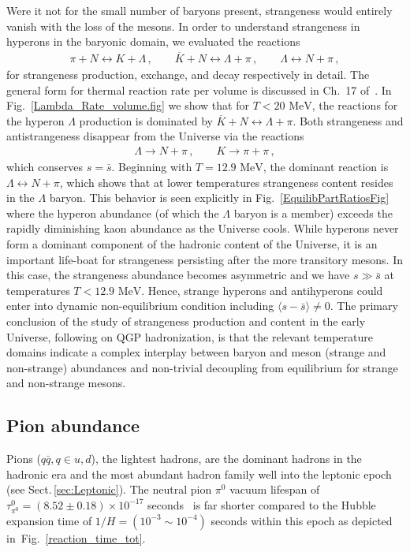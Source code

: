\documentclass[universe,article,submit,moreauthors,pdftex,a4paper]{Definitions/mdpi}
\newcommand{\MeV}{\text{ MeV}}
\newcommand*{\rf}[1]{Fig.~{\ref{#1}}}
\newcommand*{\rsec}[1]{Sect.\,{\ref{#1}}}
\begin{document}
Were it not for the small number of baryons present, strangeness would entirely vanish with the loss of the mesons. In order to understand strangeness in hyperons in the baryonic domain, we evaluated the reactions 
\begin{align}
 \pi +N\leftrightarrow K+\Lambda\,,\qquad \overline{K}+N\leftrightarrow \Lambda+\pi\,,\qquad \Lambda\leftrightarrow N+\pi\,,
\end{align}
for strangeness production, exchange, and decay respectively in detail. The general form for thermal reaction rate per volume is discussed in Ch.~17 of~\cite{Letessier:2002ony}. In \rf{Lambda_Rate_volume.fig} we show that for $T<20\MeV$, the reactions for the hyperon $\Lambda$ production is dominated by $\overline{K}+N\leftrightarrow\Lambda+\pi$. Both strangeness and antistrangeness disappear from the Universe via the reactions
\begin{align}
    \Lambda\rightarrow N+\pi\,,\qquad K\to\pi+\pi\,,
\end{align}
which conserves $s=\bar s$. Beginning with $T=12.9\MeV$, the dominant reaction is $\Lambda\leftrightarrow N+\pi$, which shows that at lower temperatures strangeness content resides in the $\Lambda$ baryon. This behavior is seen explicitly in \rf{EquilibPartRatiosFig} where the hyperon abundance (of which the $\Lambda$ baryon is a member) exceeds the rapidly diminishing kaon abundance as the Universe cools. While hyperons never form a dominant component of the hadronic content of the Universe, it is an important life-boat for strangeness persisting after the more transitory mesons. In this case, the strangeness abundance becomes asymmetric and we have $s\gg\bar{s}$ at temperatures $T<12.9\MeV$. Hence, strange hyperons and antihyperons could enter into dynamic non-equilibrium condition including $\langle s-\bar s\rangle \ne 0$. The primary conclusion of the study of strangeness production and content in the early Universe, following on QGP hadronization, is that the relevant temperature domains indicate a complex interplay between baryon and meson (strange and non-strange) abundances and non-trivial decoupling from equilibrium for strange and non-strange mesons.

\subsection{Pion abundance}\label{sec:Pions}
\noindent Pions ($q\bar q, q\in u,d$), the lightest hadrons, are the dominant hadrons in the hadronic era and the most abundant hadron family well into the leptonic epoch (see \rsec{sec:Leptonic}). The neutral pion $\pi^0$ vacuum lifespan of $\tau_{\pi^0}^0=(8.52\pm0.18)\times10^{-17}$ seconds~\cite{ParticleDataGroup:2018ovx} is far shorter compared to the Hubble expansion time of $1/H=(10^{-3}\sim10^{-4})$ seconds within this epoch as depicted in~\rf{reaction_time_tot}.
\end{document}
